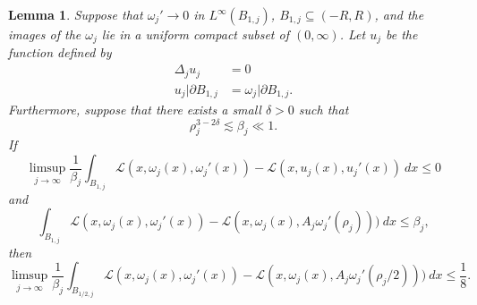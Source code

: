 \documentclass[reqno,12pt,letterpaper]{amsart}
\newtheorem{lemma}[theorem]{Lemma}
\theoremstyle{definition}
\numberwithin{equation}{section}
\begin{document}
\begin{lemma}
Suppose that $\omega_j' \to 0$ in $L^\infty(B_{1,j})$, $B_{1,j} \subseteq (-R, R)$, and the images of the $\omega_j$ lie in a uniform compact subset of $(0, \infty)$.
Let $u_j$ be the function defined by
\begin{align*}
\Delta_j u_j &= 0 \\
u_j|\partial B_{1, j} &= \omega_j|\partial B_{1, j}.
\end{align*}
Furthermore, suppose that there exists a small $\delta > 0$ such that
$$\rho_j^{3 - 2\delta} \lesssim \beta_j \ll 1.$$
If
$$\limsup_{j \to \infty} \frac{1}{\beta_j} \int_{B_{1,j}} \mathscr L(x, \omega_j(x), \omega_j'(x)) - \mathscr L(x, u_j(x), u_j'(x)) ~dx \leq 0$$
and
$$\int_{B_{1,j}} \mathscr L(x, \omega_j(x), \omega_j'(x)) - \mathscr L(x, \omega_j(x),  A_j \omega_j'(\rho_j))) ~dx \leq \beta_j,$$
then
$$\limsup_{j \to \infty} \frac{1}{\beta_j} \int_{B_{1/2,j}} \mathscr L(x, \omega_j(x), \omega_j'(x)) - \mathscr L(x, \omega_j(x),  A_j \omega_j'(\rho_j/2))) ~dx \leq \frac{1}{8}.$$
\end{lemma}
\end{document}
